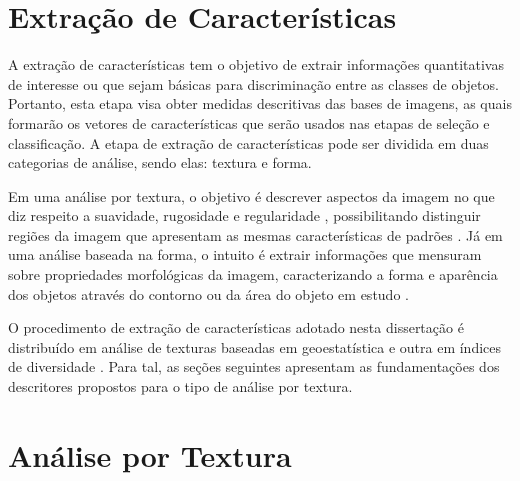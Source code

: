 \section{Extração de Características}
\label{sec:extCaracteristicas}

A extração de características tem o objetivo de extrair informações quantitativas de interesse ou que sejam básicas para discriminação entre as classes de objetos. Portanto, esta etapa visa obter medidas descritivas das bases de imagens, as quais formarão os vetores de características que serão usados nas etapas de seleção e classificação. A etapa de extração de características pode ser dividida em duas categorias de análise, sendo elas: textura e forma.

Em uma análise por textura, o objetivo é descrever aspectos da imagem no que diz respeito a suavidade, rugosidade e regularidade \cite{gonzalez2008digital}, possibilitando distinguir regiões da imagem que apresentam as mesmas características de padrões \cite{azevedo2003computaccao}. Já em uma análise baseada na forma, o intuito é extrair informações que mensuram sobre propriedades morfológicas da imagem, caracterizando a forma e aparência dos objetos
através do contorno ou da área do objeto em estudo \cite{BRAZ:2014}.

O procedimento de extração de características adotado nesta dissertação é distribuído em análise de texturas baseadas em geoestatística \cite{BRAZJUNIOR20091063} e outra em índices de diversidade \cite{16085910409503825}. Para tal, as seções seguintes apresentam as fundamentações dos descritores propostos para o tipo de análise por textura.

\section{Análise por Textura}

